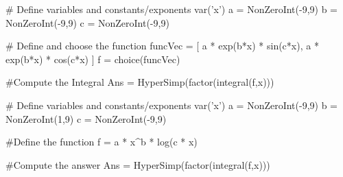 \begin{sagesilent}
# Define variables and constants/exponents
var('x')
a = NonZeroInt(-9,9)
b = NonZeroInt(-9,9)
c = NonZeroInt(-9,9)

# Define and choose the function
funcVec = [
  a * exp(b*x) * sin(c*x), 
  a * exp(b*x) * cos(c*x)
]
f = choice(funcVec)

#Compute the Integral
Ans = HyperSimp(factor(integral(f,x)))

\end{sagesilent}



\begin{sagesilent}
# Define variables and constants/exponents
var('x')
a = NonZeroInt(-9,9)
b = NonZeroInt(1,9)
c = NonZeroInt(-9,9)

#Define the function
f = a * x^b * log(c * x)

#Compute the answer
Ans = HyperSimp(factor(integral(f,x)))

\end{sagesilent}




